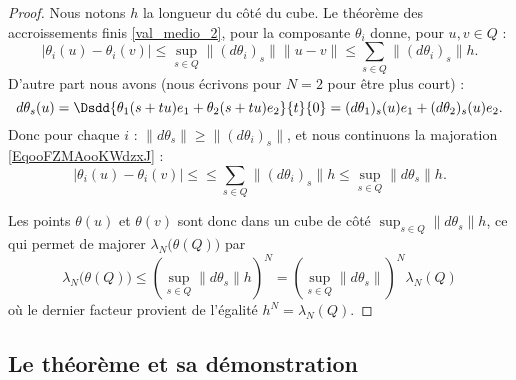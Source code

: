 \begin{proof}
    Nous notons \( h\) la longueur du côté du cube. Le théorème des accroissements finis \ref{val_medio_2}, pour la composante \( \theta_i\) donne, pour \( u,v\in Q\) :
    \begin{equation}        \label{EqooFZMAooKWdzxJ}
        \big|  \theta_i(u)-\theta_i(v) \big|\leq\sup_{s\in Q}\| (d\theta_i)_s \|\| u-v \|\leq \sum_{s\in Q}\| (d\theta_i)_s \|h.
    \end{equation}
    D'autre part nous avons (nous écrivons pour \( N=2\) pour être plus court) :
    \begin{equation}
        d\theta_s(u)=\Dsdd{ \theta_1(s+tu)e_1+\theta_2(s+tu)e_2 }{t}{0}=(d\theta_1)_s(u)e_1+(d\theta_2)_s(u)e_2.
    \end{equation}
    Donc pour chaque \( i\) : \( \| d\theta_s \|\geq \| (d\theta_i)_s \|\), et nous continuons la majoration \eqref{EqooFZMAooKWdzxJ} :
    \begin{equation}
        \big|  \theta_i(u)-\theta_i(v) \big|\leq\leq \sum_{s\in Q}\| (d\theta_i)_s \|h\leq \sup_{s\in Q}\| d\theta_s \|h.
    \end{equation}
    
    Les points \( \theta(u)\) et \( \theta(v)\) sont donc dans un cube de côté \( \sup_{s\in Q}\| d\theta_s \|h\), ce qui permet de majorer \( \lambda_N\big( \theta(Q) \big)\) par
    \begin{equation}
        \lambda_N\big( \theta(Q) \big)\leq \left( \sup_{s\in Q}\| d\theta_s \|h \right)^N=\left( \sup_{s\in Q}\| d\theta_s \| \right)^N\lambda_N(Q)
    \end{equation}
    où le dernier facteur provient de l'égalité \( h^N=\lambda_N(Q)\).
\end{proof}

\subsection{Le théorème et sa démonstration}

